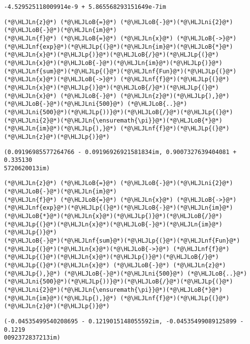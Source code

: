 \documentclass[12pt,landscape]{article}
\newcommand{\HLJLn}[1]{#1}
\newcommand{\HLJLnf}[1]{\textcolor[RGB]{66,102,213}{#1}}
\newcommand{\HLJLni}[1]{\textcolor[RGB]{59,151,46}{#1}}
\newcommand{\HLJLoB}[1]{\textcolor[RGB]{102,102,102}{\textbf{#1}}}
\newcommand{\HLJLp}[1]{#1}
\begin{document}
{\begin{lstlisting}
-4.529525118009914e-9 + 5.865568293151649e-7im
\end{lstlisting}


\begin{lstlisting}
(*@\HLJLn{z}@*) (*@\HLJLoB{=}@*) (*@\HLJLoB{-}@*)(*@\HLJLni{2}@*)(*@\HLJLoB{-}@*)(*@\HLJLn{im}@*)
(*@\HLJLn{f}@*) (*@\HLJLoB{=}@*) (*@\HLJLn{x}@*) (*@\HLJLoB{->}@*) (*@\HLJLnf{exp}@*)(*@\HLJLp{(}@*)(*@\HLJLn{im}@*)(*@\HLJLoB{*}@*)(*@\HLJLn{x}@*)(*@\HLJLp{)}@*)(*@\HLJLoB{/}@*)(*@\HLJLp{(}@*)(*@\HLJLn{x}@*)(*@\HLJLoB{-}@*)(*@\HLJLn{im}@*)(*@\HLJLp{)}@*)
(*@\HLJLnf{sum}@*)(*@\HLJLp{(}@*)(*@\HLJLnf{Fun}@*)(*@\HLJLp{(}@*)(*@\HLJLn{x}@*)(*@\HLJLoB{->}@*) (*@\HLJLnf{f}@*)(*@\HLJLp{(}@*)(*@\HLJLn{x}@*)(*@\HLJLp{)}@*)(*@\HLJLoB{/}@*)(*@\HLJLp{(}@*)(*@\HLJLn{x}@*) (*@\HLJLoB{-}@*) (*@\HLJLn{z}@*)(*@\HLJLp{),}@*) (*@\HLJLoB{-}@*)(*@\HLJLni{500}@*) (*@\HLJLoB{..}@*) (*@\HLJLni{500}@*)(*@\HLJLp{))}@*)(*@\HLJLoB{/}@*)(*@\HLJLp{(}@*)(*@\HLJLni{2}@*)(*@\HLJLn{\ensuremath{\pi}}@*)(*@\HLJLoB{*}@*)(*@\HLJLn{im}@*)(*@\HLJLp{),}@*) (*@\HLJLnf{f}@*)(*@\HLJLp{(}@*)(*@\HLJLn{z}@*)(*@\HLJLp{)}@*)
\end{lstlisting}

\begin{lstlisting}
(0.09196985577264766 - 0.09196926921581834im, 0.9007327639404081 + 0.335130
5720620013im)
\end{lstlisting}


\begin{lstlisting}
(*@\HLJLn{z}@*) (*@\HLJLoB{=}@*) (*@\HLJLoB{-}@*)(*@\HLJLni{2}@*)(*@\HLJLoB{-}@*)(*@\HLJLn{im}@*)
(*@\HLJLn{f}@*) (*@\HLJLoB{=}@*) (*@\HLJLn{x}@*) (*@\HLJLoB{->}@*) (*@\HLJLnf{exp}@*)(*@\HLJLp{(}@*)(*@\HLJLoB{-}@*)(*@\HLJLn{im}@*)(*@\HLJLoB{*}@*)(*@\HLJLn{x}@*)(*@\HLJLp{)}@*)(*@\HLJLoB{/}@*)(*@\HLJLp{(}@*)(*@\HLJLn{x}@*)(*@\HLJLoB{-}@*)(*@\HLJLn{im}@*)(*@\HLJLp{)}@*)
(*@\HLJLoB{-}@*)(*@\HLJLnf{sum}@*)(*@\HLJLp{(}@*)(*@\HLJLnf{Fun}@*)(*@\HLJLp{(}@*)(*@\HLJLn{x}@*)(*@\HLJLoB{->}@*) (*@\HLJLnf{f}@*)(*@\HLJLp{(}@*)(*@\HLJLn{x}@*)(*@\HLJLp{)}@*)(*@\HLJLoB{/}@*)(*@\HLJLp{(}@*)(*@\HLJLn{x}@*) (*@\HLJLoB{-}@*) (*@\HLJLn{z}@*)(*@\HLJLp{),}@*) (*@\HLJLoB{-}@*)(*@\HLJLni{500}@*) (*@\HLJLoB{..}@*) (*@\HLJLni{500}@*)(*@\HLJLp{))}@*)(*@\HLJLoB{/}@*)(*@\HLJLp{(}@*)(*@\HLJLni{2}@*)(*@\HLJLn{\ensuremath{\pi}}@*)(*@\HLJLoB{*}@*)(*@\HLJLn{im}@*)(*@\HLJLp{),}@*) (*@\HLJLnf{f}@*)(*@\HLJLp{(}@*)(*@\HLJLn{z}@*)(*@\HLJLp{)}@*)
\end{lstlisting}

\begin{lstlisting}
(-0.04535499540208695 - 0.1219015148055592im, -0.04535499089125899 - 0.1219
0092372837213im)
\end{lstlisting}

}
\end{document}
